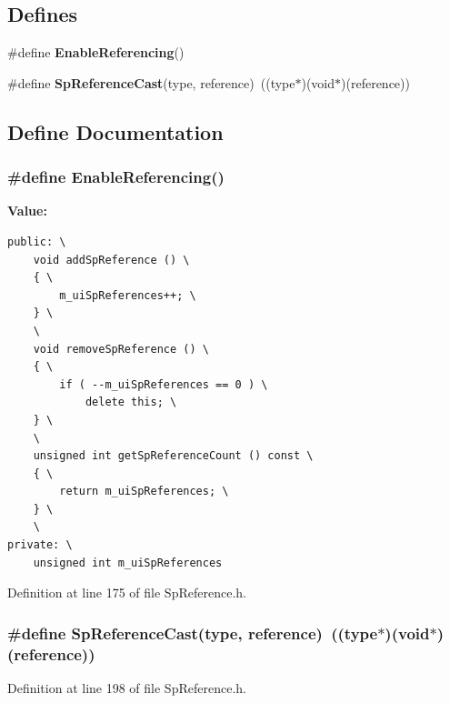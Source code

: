 \subsection*{Defines}
\begin{CompactItemize}
\item 
\#define {\bf Enable\-Referencing}()
\item 
\#define {\bf Sp\-Reference\-Cast}(type, reference)\ ((type$\ast$)(void$\ast$)(reference))
\end{CompactItemize}


\subsection{Define Documentation}
\subsubsection{\setlength{\rightskip}{0pt plus 5cm}\#define Enable\-Referencing()}\label{SpReference_8h_a0}


{\bf Value:}

\footnotesize\begin{verbatim}public: \
    void addSpReference () \
    { \
        m_uiSpReferences++; \
    } \
    \
    void removeSpReference () \
    { \
        if ( --m_uiSpReferences == 0 ) \
            delete this; \
    } \
    \
    unsigned int getSpReferenceCount () const \
    { \
        return m_uiSpReferences; \
    } \
    \
private: \
    unsigned int m_uiSpReferences
\end{verbatim}\normalsize 
Definition at line 175 of file Sp\-Reference.h.
\subsubsection{\setlength{\rightskip}{0pt plus 5cm}\#define Sp\-Reference\-Cast(type, reference)\ ((type$\ast$)(void$\ast$)(reference))}\label{SpReference_8h_a1}


Definition at line 198 of file Sp\-Reference.h.